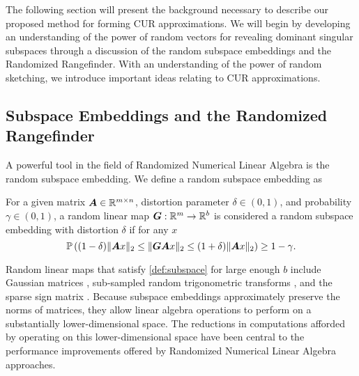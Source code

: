 The following section will present the background necessary to describe our proposed method for forming CUR approximations. We will begin by developing an understanding of the power of random vectors for revealing dominant singular subspaces through a discussion of the random subspace embeddings and the Randomized Rangefinder. With an understanding of the power of random sketching, we introduce important ideas relating to CUR approximations.

\subsection{Subspace Embeddings and the Randomized Rangefinder}
A powerful tool in the field of Randomized Numerical Linear Algebra is the random subspace embedding. We define a random subspace embedding as 
\begin{definition}\label{def:subspace}
    For a given matrix $\boldsymbol{A} \in \mathbb{R}^{m \times n}$, distortion parameter $\delta \in (0,1)$, and probability $\gamma \in (0,1)$, a random linear map $\boldsymbol{G}: \mathbb{R}^{m} \rightarrow \mathbb{R}^b$ is considered a {random subspace embedding with distortion $\delta$} if for any $x$
    \begin{equation}
        \mathbb{P} \left((1-\delta) \|\boldsymbol{A}x\|_2 \leq \|\boldsymbol{G}\boldsymbol{A}x\|_2 \leq (1+\delta)\|\boldsymbol{A}x\|_2\right) \geq 1- \gamma. 
    \end{equation}
\end{definition}
Random linear maps that satisfy \cref{def:subspace} for large enough $b$ include Gaussian matrices \cite{indyk1998approximate}, sub-sampled random trigonometric transforms \cite{ailon2009fast,tropp2011improved,woolfe2008fast}, and the sparse sign matrix \cite{cohen2016nearly, meng2013lowdistortion}. Because subspace embeddings approximately preserve the norms of matrices, they allow
linear algebra operations to perform on a substantially lower-dimensional space. The reductions in computations afforded by operating on this lower-dimensional space have been central to the performance improvements offered by Randomized Numerical Linear Algebra approaches.

